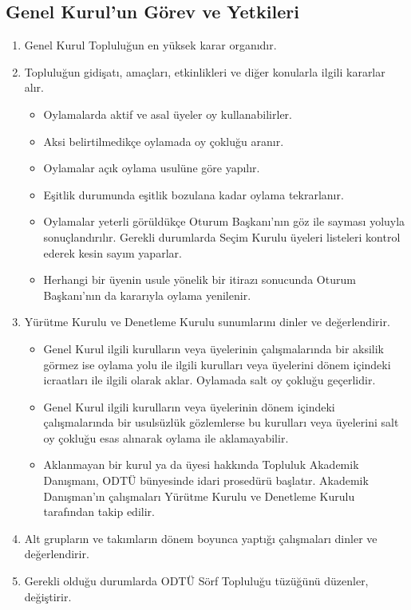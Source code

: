\documentclass[11pt,a4paper]{article}
\begin{document}
\subsection{Genel Kurul'un Görev ve Yetkileri}
\begin{enumerate}
    \item Genel Kurul Topluluğun en yüksek karar organıdır.
    \item Topluluğun gidişatı, amaçları, etkinlikleri ve diğer konularla ilgili kararlar alır.
    \begin{itemize}
        \item Oylamalarda aktif ve asal üyeler oy kullanabilirler.
        \item Aksi belirtilmedikçe oylamada oy çokluğu aranır.
        \item Oylamalar açık oylama usulüne göre yapılır.
        \item Eşitlik durumunda eşitlik bozulana kadar oylama tekrarlanır.
        \item Oylamalar yeterli görüldükçe Oturum Başkanı’nın göz ile sayması yoluyla sonuçlandırılır. Gerekli durumlarda Seçim Kurulu üyeleri listeleri kontrol ederek kesin sayım yaparlar.
        \item Herhangi bir üyenin usule yönelik bir itirazı sonucunda Oturum Başkanı’nın da kararıyla oylama yenilenir.
    \end{itemize}
    \item Yürütme Kurulu ve Denetleme Kurulu sunumlarını dinler ve değerlendirir.
    \begin{itemize}
        \item Genel Kurul ilgili kurulların veya üyelerinin çalışmalarında bir aksilik görmez ise oylama yolu ile ilgili kurulları veya üyelerini dönem içindeki icraatları ile ilgili olarak aklar. Oylamada salt oy çokluğu geçerlidir.
        \item Genel Kurul ilgili kurulların veya üyelerinin dönem içindeki çalışmalarında bir usulsüzlük gözlemlerse bu kurulları veya üyelerini salt oy çokluğu esas alınarak oylama ile aklamayabilir.
        \item Aklanmayan bir kurul ya da üyesi hakkında Topluluk Akademik Danışmanı, ODTÜ bünyesinde idari prosedürü başlatır. Akademik Danışman’ın çalışmaları Yürütme Kurulu ve Denetleme Kurulu tarafından takip edilir.
    \end{itemize}
    \item Alt grupların ve takımların dönem boyunca yaptığı çalışmaları dinler ve değerlendirir.
    \item Gerekli olduğu durumlarda ODTÜ Sörf Topluluğu tüzüğünü düzenler, değiştirir.

\end{enumerate}
\end{document}
